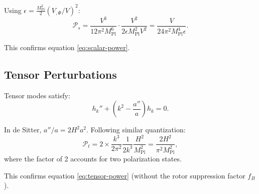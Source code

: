 \documentclass[11pt,a4paper]{article}
\numberwithin{equation}{section}
\theoremstyle{plain}
\theoremstyle{definition}
\theoremstyle{remark}
\begin{document}
Using $\epsilon = \frac{M_{\mathrm{Pl}}^2}{2}(V_{,\Phi}/V)^2$:
\begin{equation}
\mathcal{P}_s = \frac{V^3}{12\pi^2 M_{\mathrm{Pl}}^6}\cdot\frac{V^2}{2\epsilon M_{\mathrm{Pl}}^2 V^2} = \frac{V}{24\pi^2 M_{\mathrm{Pl}}^4\epsilon}.
\end{equation}

This confirms equation \eqref{eq:scalar-power}.

\subsection{Tensor Perturbations}

Tensor modes satisfy:
\begin{equation}
h_k'' + \left(k^2 - \frac{a''}{a}\right)h_k = 0.
\end{equation}

In de Sitter, $a''/a = 2H^2a^2$. Following similar quantization:
\begin{equation}
\mathcal{P}_t = 2\times\frac{k^3}{2\pi^2}\frac{1}{2k^3}\frac{H^2}{M_{\mathrm{Pl}}^2} = \frac{2H^2}{\pi^2 M_{\mathrm{Pl}}^2},
\end{equation}
where the factor of 2 accounts for two polarization states.

This confirms equation \eqref{eq:tensor-power} (without the rotor suppression factor $f_B$).

\end{document}
